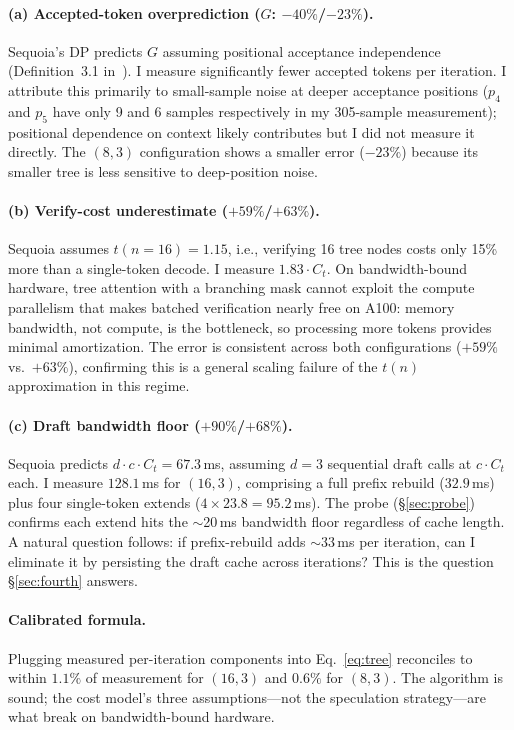 \documentclass[letterpaper,twocolumn,10pt]{article}
\begin{document}
\paragraph{(a) Accepted-token overprediction ($G$: $-40\%$/$-23\%$).}
Sequoia's DP predicts $G$ assuming positional acceptance independence (Definition~3.1 in~\cite{chen2024sequoia}).
I measure significantly fewer accepted tokens per iteration.
I attribute this primarily to small-sample noise at deeper acceptance positions ($p_4$ and $p_5$ have only 9 and 6 samples respectively in my 305-sample measurement); positional dependence on context likely contributes but I did not measure it directly.
The $(8,3)$ configuration shows a smaller error ($-23\%$) because its smaller tree is less sensitive to deep-position noise.

\paragraph{(b) Verify-cost underestimate ($+59\%$/$+63\%$).}
Sequoia assumes $t(n{=}16) = 1.15$, i.e., verifying 16 tree nodes costs only 15\% more than a single-token decode.
I measure $1.83 \cdot C_t$.
On bandwidth-bound hardware, tree attention with a branching mask cannot exploit the compute parallelism that makes batched verification nearly free on A100: memory bandwidth, not compute, is the bottleneck, so processing more tokens provides minimal amortization.
The error is consistent across both configurations ($+59\%$ vs.\ $+63\%$), confirming this is a general scaling failure of the $t(n)$ approximation in this regime.

\paragraph{(c) Draft bandwidth floor ($+90\%$/$+68\%$).}
Sequoia predicts $d \cdot c \cdot C_t = 67.3$\,ms, assuming $d{=}3$ sequential draft calls at $c \cdot C_t$ each.
I measure $128.1$\,ms for $(16,3)$, comprising a full prefix rebuild ($32.9$\,ms) plus four single-token extends ($4 \times 23.8 = 95.2$\,ms).
The probe (\S\ref{sec:probe}) confirms each extend hits the $\sim$20\,ms bandwidth floor regardless of cache length.
A natural question follows: if prefix-rebuild adds $\sim$33\,ms per iteration, can I eliminate it by persisting the draft cache across iterations? This is the question \S\ref{sec:fourth} answers.

\paragraph{Calibrated formula.}
Plugging measured per-iteration components into Eq.~\ref{eq:tree} reconciles to within $1.1\%$ of measurement for $(16,3)$ and $0.6\%$ for $(8,3)$.
The algorithm is sound; the cost model's three assumptions---not the speculation strategy---are what break on bandwidth-bound hardware.
\end{document}
